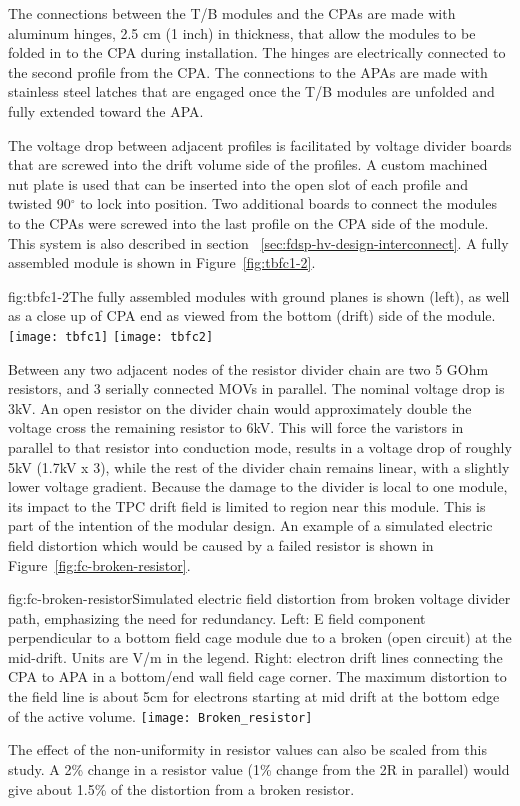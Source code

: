 The connections between the T/B modules and the CPAs are made with aluminum hinges, 2.5 cm (1 inch) in thickness, that allow the modules to be folded in to the CPA during installation. The hinges are electrically connected to the second profile from the CPA. The connections to the APAs are made with stainless steel latches that are engaged once the T/B modules are unfolded and fully extended toward the APA.

The voltage drop between adjacent profiles is facilitated by voltage divider boards that are screwed into the drift volume side of the profiles. A custom machined nut plate is used that can be inserted into the open slot of each profile and twisted 90$^\circ$ to lock into position. Two additional boards to connect the modules to the CPAs were screwed into the last profile on the CPA side of the module. This system is also described in section ~\ref{sec:fdsp-hv-design-interconnect}. A fully assembled module is shown in Figure~\ref{fig:tbfc1-2}.

\begin{dunefigure}{fig:tbfc1-2}{The fully assembled modules with ground planes is shown (left), as well as a close up of CPA end as viewed from the bottom (drift) side of the module.}
\texttt{[image: tbfc1]}
\texttt{[image: tbfc2]}
\end{dunefigure}

Between any two adjacent nodes of the resistor divider chain are two 5 GOhm resistors, and 3 serially connected MOVs in parallel.  The nominal voltage drop is 3kV.
An open resistor on the divider chain would approximately double the voltage cross the remaining resistor to 6kV.  This will force the varistors in parallel to that resistor into conduction mode, results in a voltage drop of roughly 5kV (1.7kV x 3), while the rest of the divider chain remains linear, with a slightly lower voltage gradient.
Because the damage to the divider is local to one module, its impact to the TPC drift field is limited to region near this module.  This is part of the intention of the modular design.
An example of a simulated electric field distortion which would be caused by a failed resistor is shown in Figure~\ref{fig:fc-broken-resistor}. 

\begin{dunefigure}{fig:fc-broken-resistor}{Simulated electric field distortion from broken voltage divider path, emphasizing the need for redundancy. Left: E field component perpendicular to a bottom field cage module due to a broken (open circuit) at the mid-drift. Units are V/m in the legend. Right: electron drift lines connecting the CPA to APA in a bottom/end wall field cage corner.  The maximum distortion to the field line is about 5cm for electrons starting at mid drift at the bottom edge of the active volume.}
\texttt{[image: Broken\_resistor]}
\end{dunefigure}
The effect of the non-uniformity in resistor values can also be scaled from this study.  A 2\% change in a resistor value (1\% change from the 2R in parallel) would give about 1.5\% of the distortion from a broken resistor.
 

